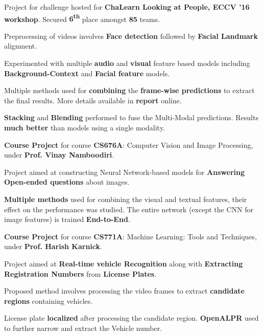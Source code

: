 \documentclass[a4paper]{norm-resume}
\begin{document}
	\begin{tightitemize}
	\small
	{
	\item Project for challenge hosted for \textbf{ChaLearn Looking at People, ECCV '16 workshop}. Secured \textbf{6\textsuperscript{th}} place amongst \textbf{85} teams.
	\item Preprocessing of videos involves \textbf{Face detection} followed by \textbf{Facial Landmark} alignment.
	\item Experimented with multiple \textbf{audio} and \textbf{visual} feature based models including \textbf{Background-Context} and \textbf{Facial feature} models.
	\item Multiple methods used for \textbf{combining} the \textbf{frame-wise predictions} to extract the final results. More details available in \textbf{report} online.
	\item \textbf{Stacking} and \textbf{Blending} performed to fuse the Multi-Modal predictions. Results \textbf{much better} than models using a single modality.
	}
	\end{tightitemize}

	\vspace{2mm}

	\descript{Mar '16 - Apr '16}	
	\begin{tightitemize}
	\small
	{
	\item \textbf{Course Project} for course \textbf{CS676A}: Computer Vision and Image Processing, under \textbf{Prof. Vinay Namboodiri}.
	\item Project aimed at constructing Neural Network-based models for \textbf{Answering Open-ended questions} about images.
	\item \textbf{Multiple methods} used for combining the visual and textual features, their effect on the performance was studied. The entire network (except the CNN for image features) is trained \textbf{End-to-End}.
	}
	\end{tightitemize}

	\vspace{2mm}

	\descript{Feb '16 - Apr '16}	
	\begin{tightitemize}
	\small
	{
	\item \textbf{Course Project} for course \textbf{CS771A}: Machine Learning: Tools and Techniques, under \textbf{Prof. Harish Karnick}.
	\item Project aimed at \textbf{Real-time vehicle Recognition} along with \textbf{Extracting Registration Numbers} from \textbf{License Plates}.
	\item Proposed method involves processing the video frames to extract \textbf{candidate regions} containing vehicles.
	\item License plate \textbf{localized} after processing the candidate region. \textbf{OpenALPR} used to further narrow and extract the Vehicle number.
	}
	\end{tightitemize}
\end{document}
